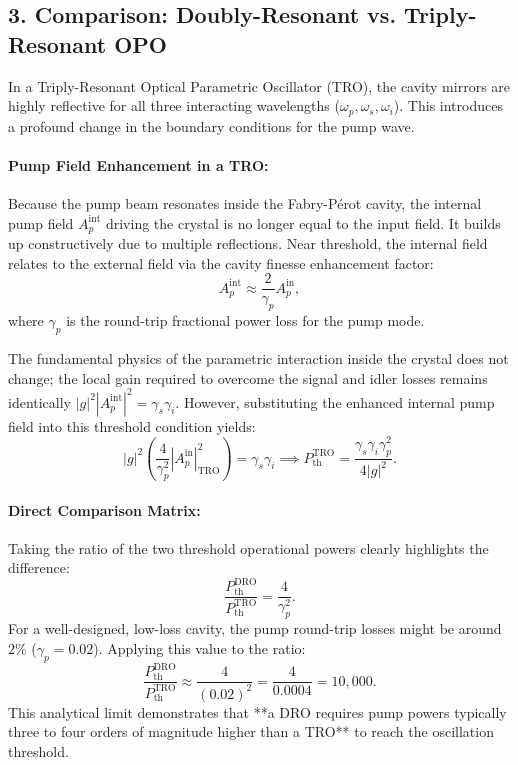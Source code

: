 \begin{resolucao}[Solution]
    \subsection*{3. Comparison: Doubly-Resonant vs. Triply-Resonant OPO}

    In a Triply-Resonant Optical Parametric Oscillator (TRO), the cavity mirrors are highly reflective for all three interacting wavelengths ($\omega_p, \omega_s, \omega_i$). This introduces a profound change in the boundary conditions for the pump wave.

    \paragraph*{Pump Field Enhancement in a TRO:}
    Because the pump beam resonates inside the Fabry-Pérot cavity, the internal pump field $A_p^{\mathrm{int}}$ driving the crystal is no longer equal to the input field. It builds up constructively due to multiple reflections. Near threshold, the internal field relates to the external field via the cavity finesse enhancement factor:
    \begin{equation}
        A_p^{\mathrm{int}} \approx \frac{2}{\gamma_p} A_p^{\mathrm{in}},
    \end{equation}
    where $\gamma_p$ is the round-trip fractional power loss for the pump mode.

    The fundamental physics of the parametric interaction inside the crystal does not change; the local gain required to overcome the signal and idler losses remains identically $|g|^2 |A_p^{\mathrm{int}}|^2 = \gamma_s \gamma_i$. However, substituting the enhanced internal pump field into this threshold condition yields:
    \begin{equation}
        |g|^2 \left( \frac{4}{\gamma_p^2} |A_p^{\mathrm{in}}|^2_{\mathrm{TRO}} \right) = \gamma_s \gamma_i \implies \boxed{P_{\mathrm{th}}^{\mathrm{TRO}} = \frac{\gamma_s \gamma_i \gamma_p^2}{4 |g|^2}}.
    \end{equation}

    \paragraph*{Direct Comparison Matrix:}
    Taking the ratio of the two threshold operational powers clearly highlights the difference:
    \begin{equation}
        \frac{P_{\mathrm{th}}^{\mathrm{DRO}}}{P_{\mathrm{th}}^{\mathrm{TRO}}} = \frac{4}{\gamma_p^2}.
    \end{equation}
    For a well-designed, low-loss cavity, the pump round-trip losses might be around $2\%$ ($\gamma_p = 0.02$). Applying this value to the ratio:
    \[
    \frac{P_{\mathrm{th}}^{\mathrm{DRO}}}{P_{\mathrm{th}}^{\mathrm{TRO}}} \approx \frac{4}{(0.02)^2} = \frac{4}{0.0004} = 10,000.
    \]
    This analytical limit demonstrates that **a DRO requires pump powers typically three to four orders of magnitude higher than a TRO** to reach the oscillation threshold.


\end{resolucao}
